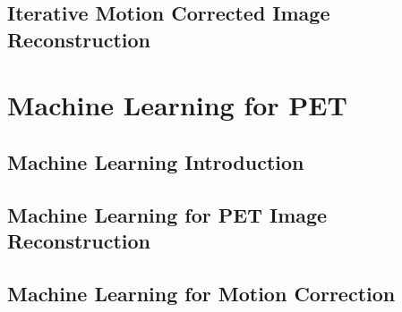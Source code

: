         \subsection{Iterative Motion Corrected Image Reconstruction} \label{iterative_motion_corrected_image_reconstruction}
            \blindtext
    
    \section{Machine Learning for PET} \label{machine_learning_for_pet}
        \blindtext
        
        \subsection{Machine Learning Introduction} \label{machine_learning_introduction}
            \blindtext
        
        \subsection{Machine Learning for PET Image Reconstruction} \label{machine_learning_for_pet_image_reconstruction}
            \blindtext
        
        \subsection{Machine Learning for Motion Correction} \label{machine_learning_for_motion_correction}
            \blindtext
